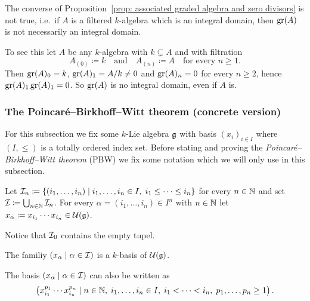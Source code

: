 \begin{rem}
 The converse of Proposition~\ref{prop: associated graded algebra and zero divisors} is not true, i.e.\ if $A$ is a filtered $k$-algebra which is an integral domain, then $\operatorname{gr}(A)$ is not necessarily an integral domain.
 
 To see this let $A$ be any $k$-algebra with $k \subsetneq A$ and with filtration
 \[
  A_{(0)} \coloneqq k
  \quad\text{and}\quad
  A_{(n)} \coloneqq A
  \quad\text{for every $n \geq 1$}.
 \]
 Then $\operatorname{gr}(A)_0 = k$, $\operatorname{gr}(A)_1 = A/k \neq 0$ and $\operatorname{gr}(A)_n = 0$ for every $n \geq 2$, hence $\operatorname{gr}(A)_1 \operatorname{gr}(A)_1 = 0$. So $\operatorname{gr}(A)$ is no integral domain, even if $A$ is.
\end{rem}





\subsubsection{The Poincar\'{e}--Birkhoff--Witt theorem (concrete version)}
For this subsection we fix some $k$-Lie algebra $\mathfrak{g}$ with basis $(x_i)_{i \in I}$ where $(I, \leq)$ is a totally ordered index set. Before stating and proving the \emph{Poincar\'{e}--Birkhoff--Witt theorem} (PBW) we fix some notation which we will only use in this subsection.


\begin{defi}
 Let $\mathcal{I}_n \coloneqq \{(i_1, \dotsc, i_n) \mid i_1, \dotsc, i_n \in I, \; i_1 \leq \dotsb \leq i_n\}$ for every $n \in \mathbb{N}$ and set $\mathcal{I} \coloneqq \bigcup_{n \in \mathbb{N}} \mathcal{I}_n$. For every $\alpha = (i_1, \dotsc, i_n) \in I^n$ with $n \in \mathbb{N}$ let $x_\alpha \coloneqq x_{i_1} \dotsm x_{i_n} \in \mathcal{U}(\mathfrak{g})$.
\end{defi}


\begin{rem}
 Notice that $\mathcal{I}_0$ contains the empty tupel.
\end{rem}


\begin{thrm} \label{thrm: pbw concrete}
 The familiy $(x_\alpha \mid \alpha \in \mathcal{I})$ is a $k$-basis of $\mathcal{U}(\mathfrak{g})$.
\end{thrm}


\begin{rem}
 The basis $(x_\alpha \mid \alpha \in \mathcal{I})$ can also be written as
 \[
  \left(
   x_{i_1}^{p_1} \dotsm x_{i_n}^{p_n}
  \mid
   n \in \mathbb{N},\;
   i_1, \dotsc, i_n \in I,\;
   i_1 < \dotsb < i_n,\;
   p_1, \dotsc, p_n \geq 1
  \right).
 \]
\end{rem}


